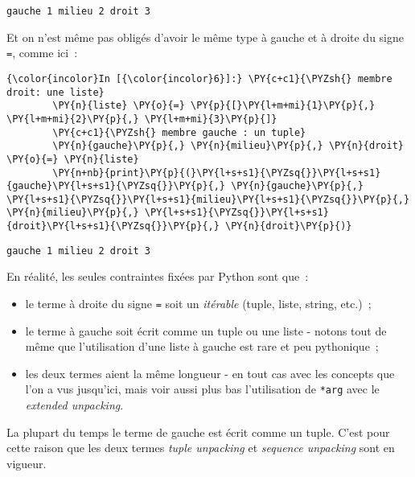     \begin{Verbatim}[commandchars=\\\{\}]
gauche 1 milieu 2 droit 3

    \end{Verbatim}

    Et on n'est même pas obligés d'avoir le même type à gauche et à droite
du signe \texttt{=}, comme ici~:

    \begin{Verbatim}[commandchars=\\\{\}]
{\color{incolor}In [{\color{incolor}6}]:} \PY{c+c1}{\PYZsh{} membre droit: une liste}
        \PY{n}{liste} \PY{o}{=} \PY{p}{[}\PY{l+m+mi}{1}\PY{p}{,} \PY{l+m+mi}{2}\PY{p}{,} \PY{l+m+mi}{3}\PY{p}{]}
        \PY{c+c1}{\PYZsh{} membre gauche : un tuple}
        \PY{n}{gauche}\PY{p}{,} \PY{n}{milieu}\PY{p}{,} \PY{n}{droit} \PY{o}{=} \PY{n}{liste}
        \PY{n+nb}{print}\PY{p}{(}\PY{l+s+s1}{\PYZsq{}}\PY{l+s+s1}{gauche}\PY{l+s+s1}{\PYZsq{}}\PY{p}{,} \PY{n}{gauche}\PY{p}{,} \PY{l+s+s1}{\PYZsq{}}\PY{l+s+s1}{milieu}\PY{l+s+s1}{\PYZsq{}}\PY{p}{,} \PY{n}{milieu}\PY{p}{,} \PY{l+s+s1}{\PYZsq{}}\PY{l+s+s1}{droit}\PY{l+s+s1}{\PYZsq{}}\PY{p}{,} \PY{n}{droit}\PY{p}{)}
\end{Verbatim}


    \begin{Verbatim}[commandchars=\\\{\}]
gauche 1 milieu 2 droit 3

    \end{Verbatim}

    En réalité, les seules contraintes fixées par Python sont que~:

\begin{itemize}
\tightlist
\item
  le terme à droite du signe \texttt{=} soit un \emph{itérable} (tuple,
  liste, string, etc.)~;
\item
  le terme à gauche soit écrit comme un tuple ou une liste - notons tout
  de même que l'utilisation d'une liste à gauche est rare et peu
  pythonique~;
\item
  les deux termes aient la même longueur - en tout cas avec les concepts
  que l'on a vus jusqu'ici, mais voir aussi plus bas l'utilisation de
  \texttt{*arg} avec le \emph{extended unpacking}.
\end{itemize}

    La plupart du temps le terme de gauche est écrit comme un tuple. C'est
pour cette raison que les deux termes \emph{tuple unpacking} et
\emph{sequence unpacking} sont en vigueur.

